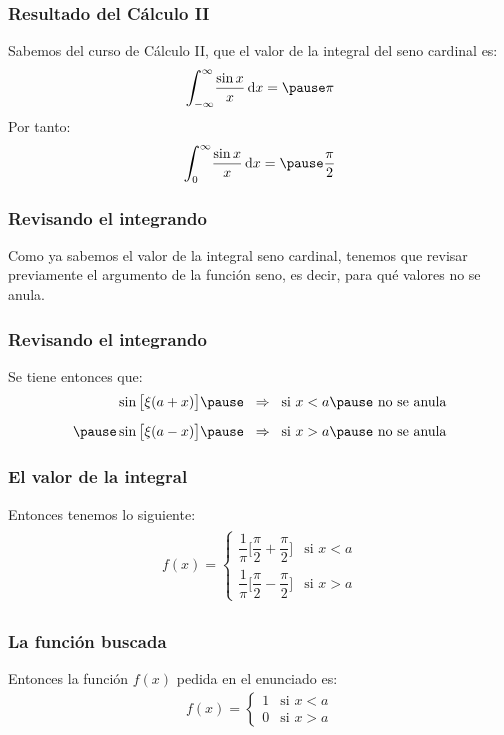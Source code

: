 \documentclass[12pt]{beamer}
\begin{document}
\begin{frame}
\frametitle{Resultado del Cálculo II}
Sabemos del curso de Cálculo II, que el valor de la integral del seno cardinal es:
\pause
\begin{eqnarray*}
\scaleint{6ex}_{\bs -\infty}^{\infty} \dfrac{\sin x}{x} \dd{x} = \pause \pi
\end{eqnarray*}
\pause
Por tanto:
\pause
\begin{eqnarray*}
\scaleint{6ex}_{\bs 0}^{\infty} \dfrac{\sin x}{x} \dd{x} = \pause \dfrac{\pi}{2}
\end{eqnarray*}
\end{frame}
\begin{frame}
\frametitle{Revisando el integrando}
Como ya sabemos el valor de la integral seno cardinal, tenemos que revisar previamente el argumento de la función seno, \pause es decir, para qué valores no se anula.
\end{frame}
\begin{frame}
\frametitle{Revisando el integrando}
Se tiene entonces que:
\begin{eqnarray*}
\begin{aligned}
\sin \big[ \xi (a + x) \big] \pause \hspace{0.2cm} \Rightarrow \hspace{0.2cm} \mbox{si } x < a \pause \mbox{ no se anula} \\[0.5em] \pause
\sin \big[ \xi (a - x) \big] \pause \hspace{0.2cm} \Rightarrow \hspace{0.2cm} \mbox{si } x > a \pause \mbox{ no se anula}
\end{aligned}
\end{eqnarray*}
\end{frame}
\begin{frame}
\frametitle{El valor de la integral}
Entonces tenemos lo siguiente:
\begin{eqnarray*}
\begin{aligned}
f (x) = \begin{cases}
\dfrac{1}{\pi} \bigg[ \dfrac{\pi}{2} + \dfrac{\pi}{2} \bigg] & \mbox{si } x < a \\[1em]
\dfrac{1}{\pi} \bigg[ \dfrac{\pi}{2} - \dfrac{\pi}{2} \bigg] & \mbox{si } x > a
\end{cases}
\end{aligned}
\end{eqnarray*}
\end{frame}
\begin{frame}
\frametitle{La función buscada}
Entonces la función $f (x)$ pedida en el enunciado es:
\begin{align*}
f (x) = \begin{cases}
1 & \mbox{si } x < a \\[1em]
0 & \mbox{si } x > a
\end{cases}
\end{align*}
\end{frame}
\end{document}

